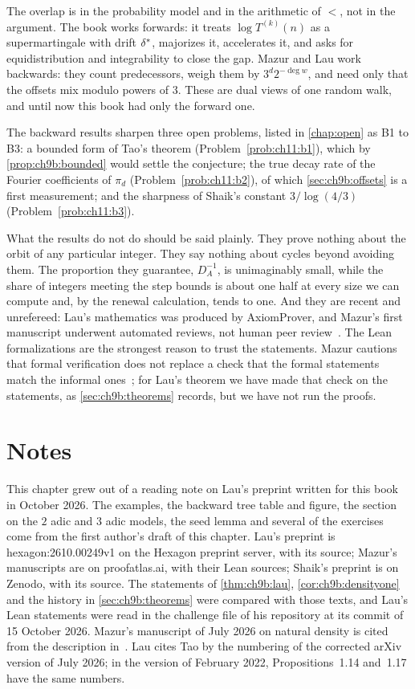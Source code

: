 The overlap is in the probability model and in the arithmetic of $\lt$, not in the argument. The book works forwards: it treats $\log T^{(k)}(n)$ as a supermartingale with drift $\delta^{*}$, majorizes it, accelerates it, and asks for equidistribution and integrability to close the gap. Mazur and Lau work backwards: they count predecessors, weigh them by $3^d2^{-\deg w}$, and need only that the offsets mix modulo powers of $3$. These are dual views of one random walk, and until now this book had only the forward one.

The backward results sharpen three open problems, listed in \cref{chap:open} as B1 to B3: a bounded form of Tao's theorem (Problem~\ref{prob:ch11:b1}), which by \cref{prop:ch9b:bounded} would settle the conjecture; the true decay rate of the Fourier coefficients of $\pi_d$ (Problem~\ref{prob:ch11:b2}), of which \cref{sec:ch9b:offsets} is a first measurement; and the sharpness of Shaik's constant $3/\log(4/3)$ (Problem~\ref{prob:ch11:b3}).

What the results do not do should be said plainly. They prove nothing about the orbit of any particular integer. They say nothing about cycles beyond avoiding them. The proportion they guarantee, $D_A^{-1}$, is unimaginably small, while the share of integers meeting the step bounds is about one half at every size we can compute and, by the renewal calculation, tends to one. And they are recent and unrefereed: Lau's mathematics was produced by AxiomProver, and Mazur's first manuscript underwent automated reviews, not human peer review~\cite{mazur2026pred}. The Lean formalizations are the strongest reason to trust the statements. Mazur cautions that formal verification does not replace a check that the formal statements match the informal ones~\cite{mazur2026time}; for Lau's theorem we have made that check on the statements, as \cref{sec:ch9b:theorems} records, but we have not run the proofs.

\section*{Notes}

This chapter grew out of a reading note on Lau's preprint written for this book in October 2026. The examples, the backward tree table and figure, the section on the $2$ adic and $3$ adic models, the seed lemma and several of the exercises come from the first author's draft of this chapter. Lau's preprint is hexagon:2610.00249v1 on the Hexagon preprint server, with its source; Mazur's manuscripts are on proofatlas.ai, with their Lean sources; Shaik's preprint is on Zenodo, with its source. The statements of \cref{thm:ch9b:lau}, \cref{cor:ch9b:densityone} and the history in \cref{sec:ch9b:theorems} were compared with those texts, and Lau's Lean statements were read in the challenge file of his repository at its commit of 15 October 2026. Mazur's manuscript of July 2026 on natural density is cited from the description in~\cite{mazur2026time}. Lau cites Tao by the numbering of the corrected arXiv version of July 2026; in the version of February 2022, Propositions~1.14 and~1.17 have the same numbers.

